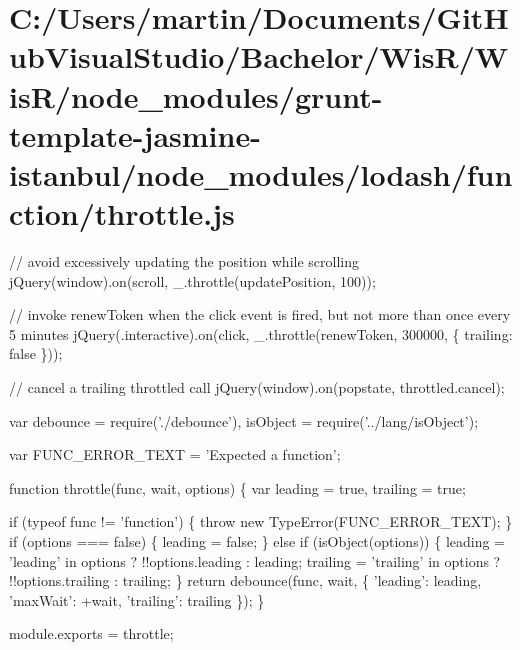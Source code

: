 \hypertarget{_c_1_2_users_2martin_2_documents_2_git_hub_visual_studio_2_bachelor_2_wis_r_2_wis_r_2node_module6205807321d733b643c3a4cee4c84949}{}\section{C\+:/\+Users/martin/\+Documents/\+Git\+Hub\+Visual\+Studio/\+Bachelor/\+Wis\+R/\+Wis\+R/node\+\_\+modules/grunt-\/template-\/jasmine-\/istanbul/node\+\_\+modules/lodash/function/throttle.\+js}
// avoid excessively updating the position while scrolling j\+Query(window).on(\textquotesingle{}scroll\textquotesingle{}, \+\_\+.\+throttle(update\+Position, 100));

// invoke {\ttfamily renew\+Token} when the click event is fired, but not more than once every 5 minutes j\+Query(\textquotesingle{}.interactive\textquotesingle{}).on(\textquotesingle{}click\textquotesingle{}, \+\_\+.\+throttle(renew\+Token, 300000, \{ \textquotesingle{}trailing\textquotesingle{}\+: false \}));

// cancel a trailing throttled call j\+Query(window).on(\textquotesingle{}popstate\textquotesingle{}, throttled.\+cancel);


\begin{DoxyCodeInclude}
var debounce = require(\textcolor{stringliteral}{'./debounce'}),
    isObject = require(\textcolor{stringliteral}{'../lang/isObject'});

var FUNC\_ERROR\_TEXT = \textcolor{stringliteral}{'Expected a function'};

\textcolor{keyword}{function} throttle(func, wait, options) \{
  var leading = \textcolor{keyword}{true},
      trailing = \textcolor{keyword}{true};

  \textcolor{keywordflow}{if} (typeof func != \textcolor{stringliteral}{'function'}) \{
    \textcolor{keywordflow}{throw} \textcolor{keyword}{new} TypeError(FUNC\_ERROR\_TEXT);
  \}
  \textcolor{keywordflow}{if} (options === \textcolor{keyword}{false}) \{
    leading = \textcolor{keyword}{false};
  \} \textcolor{keywordflow}{else} \textcolor{keywordflow}{if} (isObject(options)) \{
    leading = \textcolor{stringliteral}{'leading'} in options ? !!options.leading : leading;
    trailing = \textcolor{stringliteral}{'trailing'} in options ? !!options.trailing : trailing;
  \}
  \textcolor{keywordflow}{return} debounce(func, wait, \{ \textcolor{stringliteral}{'leading'}: leading, \textcolor{stringliteral}{'maxWait'}: +wait, \textcolor{stringliteral}{'trailing'}: trailing \});
\}

module.exports = throttle;
\end{DoxyCodeInclude}
 
